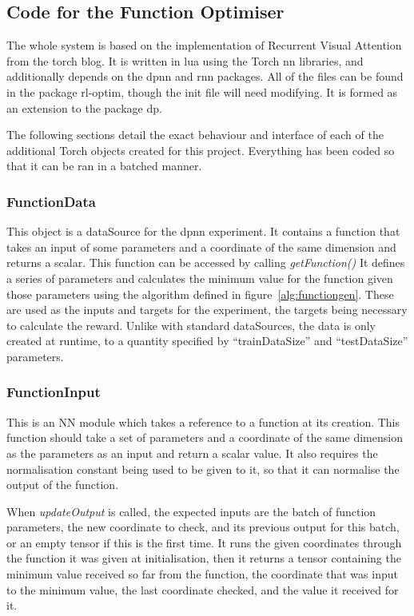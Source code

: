 \subsection{Code for the Function Optimiser}
The whole system is based on the implementation of Recurrent Visual Attention from the torch blog\cite{Torch:RVA}. It is written in lua using the Torch nn libraries, and additionally depends on the dpnn and rnn packages. All of the files can be found in the package rl-optim, though the init file will need modifying. It is formed as an extension to the package dp.

The following sections detail the exact behaviour and interface of each of the additional Torch objects created for this project. Everything has been coded so that it can be ran in a batched manner.

\subsubsection{FunctionData}
This object is a dataSource for the dpnn experiment. It contains a function that takes an input of some parameters and a coordinate of the same dimension and returns a scalar. This function can be accessed by calling \emph{getFunction()} It defines a series of parameters and calculates the minimum value for the function given those parameters using the algorithm defined in figure~\ref{alg:functiongen}. These are used as the inputs and targets for the experiment, the targets being necessary to calculate the reward. Unlike with standard dataSources, the data is only created at runtime, to a quantity specified by ``trainDataSize'' and ``testDataSize'' parameters.

\subsubsection{FunctionInput}
This is an NN module which takes a reference to a function at its creation. This function should take a set of parameters and a coordinate of the same dimension as the parameters as an input and return a scalar value. It also requires the normalisation constant being used to be given to it, so that it can normalise the output of the function.

 When \emph{updateOutput} is called, the expected inputs are the batch of function parameters, the new coordinate to check, and its previous output for this batch, or an empty tensor if this is the first time. It runs the given coordinates through the function it was given at initialisation, then it returns a tensor containing the minimum value received so far from the function, the coordinate that was input to the minimum value, the last coordinate checked, and the value it received for it.

